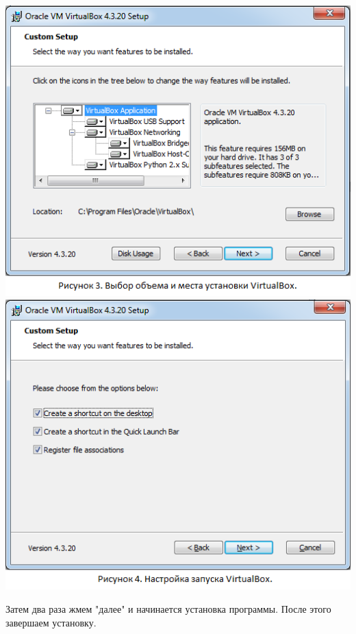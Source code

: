 \documentclass[a4paper,14pt]{extarticle}
\begin{document}
\begin{center}
  \includegraphics[scale=0.465]{img/VirtualBox1.png}
  \includegraphics[scale=0.465]{img/VirtualBox2.png}\\
\end{center}
Затем два раза жмем "далее" и начинается установка программы. После этого завершаем установку.
\end{document}
